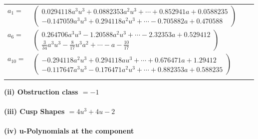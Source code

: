\documentclass[1p]{elsarticle_modified}
\theoremstyle{definition}
\begin{document}
\begin{tabular}{m{7pt} m{180pt} m{7pt} m{180pt} }
\flushright $a_{1}=$&$\begin{pmatrix}0.0294118 a^{3} u^{3}+0.0882353 a^{2} u^{3}+\cdots+0.852941 a+0.0588235\\-0.147059 a^{3} u^{3}+0.294118 a^{2} u^{3}+\cdots-0.705882 a+0.470588\end{pmatrix}$ \\
\flushright $a_{6}=$&$\begin{pmatrix}0.264706 a^{3} u^{3}-1.20588 a^{2} u^{3}+\cdots-2.32353 a+0.529412\\\frac{3}{34} a^3 u^3-\frac{8}{17} u^3 a^2+\cdots- a-\frac{10}{17}\end{pmatrix}$ \\
\flushright $a_{10}=$&$\begin{pmatrix}-0.294118 a^{2} u^{3}+0.294118 a u^{3}+\cdots+0.676471 a+1.29412\\-0.117647 a^{3} u^{3}-0.176471 a^{2} u^{3}+\cdots+0.882353 a+0.588235\end{pmatrix}$\\&\end{tabular}
\flushleft \textbf{(ii) Obstruction class $= -1$}\\~\\
\flushleft \textbf{(iii) Cusp Shapes $= 4 u^3+4 u-2$}\\~\\
\newpage\renewcommand{\arraystretch}{1}
\flushleft \textbf{(iv) u-Polynomials at the component}\newline \\
\end{document}

